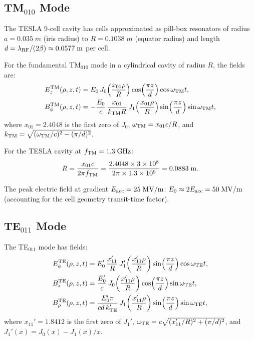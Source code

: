 \documentclass[aps,prd,twocolumn,superscriptaddress,nofootinbib]{revtex4-2}
\newcommand{\ee}[1]{\times 10^{#1}}
\begin{document}
\subsection{TM$_{010}$ Mode}

The TESLA 9-cell cavity has cells approximated as pill-box
resonators of radius $a = 0.035\;\si{m}$ (iris radius) to
$R = 0.1038\;\si{m}$ (equator radius) and length
$d = \lambda_{\rm RF}/(2\beta) \approx 0.0577\;\si{m}$ per cell.

For the fundamental TM$_{010}$ mode in a cylindrical cavity of
radius $R$, the fields are:
\begin{align}
E_z^{\rm TM}(\rho,z,t) &= E_0\,J_0\!\left(\frac{x_{01}\rho}{R}\right)\cos\!\left(\frac{\pi z}{d}\right)\cos\omega_{\rm TM} t, \label{eq:Ez-TM}\\
B_\phi^{\rm TM}(\rho,z,t) &= -\frac{E_0}{c}\,\frac{x_{01}}{k_{\rm TM}R}\,J_1\!\left(\frac{x_{01}\rho}{R}\right)\sin\!\left(\frac{\pi z}{d}\right)\sin\omega_{\rm TM} t, \label{eq:Bphi-TM}
\end{align}
where $x_{01} = 2.4048$ is the first zero of $J_0$,
$\omega_{\rm TM} = x_{01}c/R$, and
$k_{\rm TM} = \sqrt{(\omega_{\rm TM}/c)^2 - (\pi/d)^2}$.

For the TESLA cavity at $f_{\rm TM} = 1.3\;\si{GHz}$:
\begin{equation}
R = \frac{x_{01}c}{2\pi f_{\rm TM}} = \frac{2.4048 \times 3\ee{8}}{2\pi \times 1.3\ee{9}} = 0.0883\;\si{m}.
\end{equation}

The peak electric field at gradient $E_{\rm acc} = 25\;\si{MV/m}$:
$E_0 \approx 2E_{\rm acc} = 50\;\si{MV/m}$ (accounting for
the cell geometry transit-time factor).

\subsection{TE$_{011}$ Mode}

The TE$_{011}$ mode has fields:
\begin{align}
E_\phi^{\rm TE}(\rho,z,t) &= E_0'\,\frac{x_{11}'}{R}\,J_1'\!\left(\frac{x_{11}'\rho}{R}\right)\sin\!\left(\frac{\pi z}{d}\right)\cos\omega_{\rm TE} t, \label{eq:Ephi-TE}\\
B_z^{\rm TE}(\rho,z,t) &= \frac{E_0'}{c}\,J_0\!\left(\frac{x_{11}'\rho}{R}\right)\cos\!\left(\frac{\pi z}{d}\right)\sin\omega_{\rm TE} t, \label{eq:Bz-TE}\\
B_\rho^{\rm TE}(\rho,z,t) &= \frac{E_0'\pi}{cd\,k_{\rm TE}'}\,J_1\!\left(\frac{x_{11}'\rho}{R}\right)\sin\!\left(\frac{\pi z}{d}\right)\sin\omega_{\rm TE} t, \label{eq:Brho-TE}
\end{align}
where $x_{11}' = 1.8412$ is the first zero of $J_1'$,
$\omega_{\rm TE} = c\sqrt{(x_{11}'/R)^2 + (\pi/d)^2}$,
and $J_1'(x) = J_0(x) - J_1(x)/x$.
\end{document}
